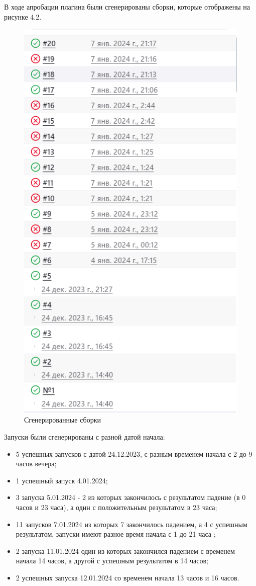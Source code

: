  В ходе апробации плагина были сгенерированы сборки, которые отображены на рисунке 4.2.
 
 \begin{figure}[ht!] 
	\center
	\includegraphics [scale=0.47] {my_folder/images//builds}
	\caption{Сгенерированные сборки} 
	\label{fig:builds}  
\end{figure}

Запуски были сгенерированы с разной датой начала:

\begin{itemize}
	\item 5 успешных запусков с датой 24.12.2023, с разным временем начала с 2 до 9 часов вечера;
	\item 1 успешный запуск 4.01.2024;
	\item 3 запуска 5.01.2024 - 2 из которых закончилось с результатом падение (в 0 часов и 23 часа), а один с положительным результатом в 23 часа;
	\item 11 запусков 7.01.2024 из которых 7 закончилось падением, а 4 с успешным результатом, запуски имеют разное время начала с 1 до 21 часа ;
	\item 2 запуска 11.01.2024 один из которых закончился падением с временем начала 14 часов, а другой с успешным результатом в 14 часов;
	\item 2 успешных запуска 12.01.2024 со временем начала 13 часов и 16 часов.
\end{itemize}


